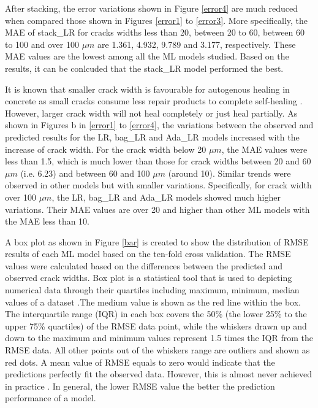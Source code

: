 \documentclass[11pt]{article}
\begin{document}
    After stacking, the error variations shown in Figure \ref{error4} are much reduced when compared those shown in Figures \ref{error1} to \ref{error3}. More specifically, the MAE of stack\_LR for cracks widths less than 20, between 20 to 60, between 60 to 100 and over 100 $\mu m$ are 1.361, 4.932, 9.789 and 3.177, respectively. These MAE values are the lowest among all the ML models studied. Based on the results, it can be conlcuded that the stack\_LR model performed the best. 
    
    
    It is known that smaller crack width is favourable for autogenous healing in concrete \cite{herbert2013selfhealing,liu2017influence} as small cracks consume less repair products to complete self-healing \cite{de2018review}. However, larger crack width will not heal completely or just heal partially. As shown in Figures b in \ref{error1} to \ref{error4}, the variations between the observed and predicted results for the LR, bag\_LR and Ada\_LR models increased with the increase of crack width. For the crack width below 20 $\mu m$, the MAE values were less than 1.5, which is much lower than those for crack widths between 20 and 60 $\mu m$ (i.e. 6.23) and between 60 and 100 $\mu m$ (around 10). Similar trends were observed in other models but with smaller variations. Specifically, for crack width over 100 $\mu m$, the LR, bag\_LR and Ada\_LR models showed much higher variations. Their MAE values are over 20 and higher than other ML models with the MAE less than 10.
    

	
	
	
	A box plot as shown in Figure \ref{bar} is created to show the distribution of RMSE results of each ML model based on the ten-fold cross validation. The RMSE values were calculated based on the differences between the predicted and observed crack widths. Box plot is a statistical tool that is used to depicting numerical data through their quartiles including maximum, minimum, median values of a dataset \cite{taffese2015caprm,olalusi2020machine}.The medium value is shown as the red line within the box. The interquartile range (IQR) in each box covers the 50\% (the lower 25\% to the upper 75\% quartiles) of the RMSE data point, while the whiskers drawn up and down to the maximum and minimum values represent 1.5 times the IQR from the RMSE data. All other points out of the whiskers range are outliers and shown as red dots. A mean value of RMSE equals to zero would indicate that the predictions perfectly fit the observed data. However, this is almost never achieved in practice \cite{wikiRMSE}. In general, the lower RMSE value the  better the prediction performance of a model. 
   	
\end{document}
